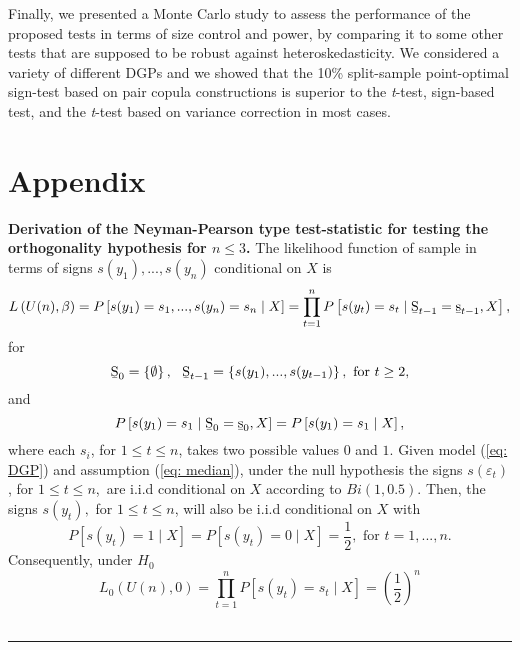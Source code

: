 \documentclass[harvard,11pt]{article}
\newenvironment{proof}[1][Proof]{\textbf{#1.} }{\  \rule{0.5em}{0.5em}}
\begin{document}
Finally, we presented a Monte Carlo study to assess the performance of the proposed tests in terms of size control and power, by comparing it to some other tests that are supposed to be robust against heteroskedasticity. We considered a variety of different DGPs and we showed that the 10\% split-sample point-optimal sign-test based on pair copula constructions is superior to the \textit{t}-test, \citet{dufour1995exact} sign-based test,
and the \textit{t}-test based on \citet{white1980heteroskedasticity} variance correction in most cases.
\newpage

\section{Appendix}

\begin{proof}[Derivation of the Neyman-Pearson type test-statistic for testing the orthogonality hypothesis for $n\leq 3$]
The likelihood function of sample in terms of signs $s(y_{1}),...,s(y_{n})$ conditional on $X$ is
\begin{equation*}
L\left( U(n),\beta \right) =P\left[
s(y_{1})=s_{1},...,s(y_{n})=s_{n}\mid X\right] =\prod\limits_{t=1}^{n}%
P\left[ s(y_{t})=s_{t}\mid \text{\b{S}}_{t-1}=\text{\b{s}}_{t-1},X\right] ,
\end{equation*}%
for 
\begin{equation*}
\text{\b{S}}_{0}=\left\{ \emptyset \right\} ,\text{ \ \b{S}}_{t-1}=\left\{
s(y_{1}),...,s(y_{t-1})\right\} ,\text{ for }t\geq 2,
\end{equation*}%
and%
\begin{equation*}
P\left[ s(y_{1})=s_{1}\mid \text{\b{S}}_{0}=\text{\b{s}}_{0},X\right] =P%
\left[s(y_{1})=s_{1}\mid X\right] ,
\end{equation*}%
where each $s_{i}$, for $1\leq t\leq n$, takes two possible values $0$ and $%
1 $. Given model (\ref{eq: DGP}) and assumption (\ref{eq: median}), under the null hypothesis the signs $s(\varepsilon_{t})$, for $1\leq t\leq n$,\ are i.i.d conditional on $X$ according to $Bi(1,0.5)$. Then, the signs $s(y_{t}),$ for $1\leq t\leq n$, will also be i.i.d conditional on $X$
with%
\begin{equation*}
P\left[ s(y_{t})=1\mid X\right] =P\left[ s(y_{t})=0\mid X\right] =%
\frac{1}{2},\text{ for }t=1,...,n.
\end{equation*}%
Consequently, under $H_{0}$%
\begin{equation*}
L_{0}\left( U(n),0\right) =\prod\limits_{t=1}^{n}
P\left[ s(y_{t})=s_{t}\mid X\right] =\left( \frac{1}{2}\right) ^{n}

\end{equation*}
\end{proof}
\end{document}
